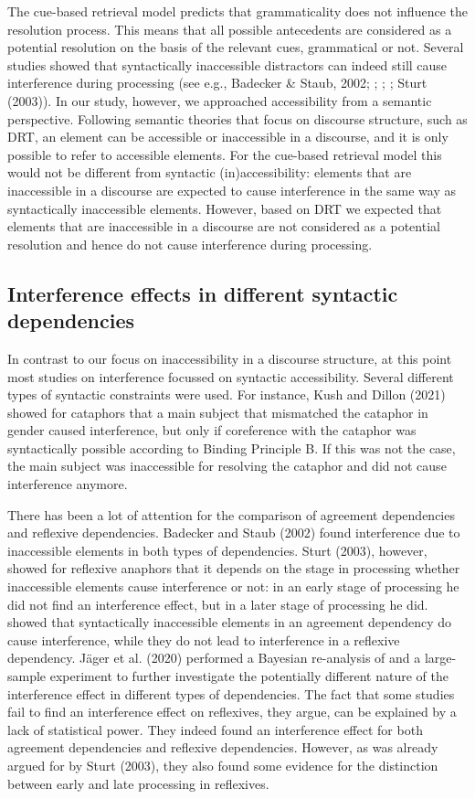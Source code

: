 \documentclass[11pt]{article} %
\begin{document}
The cue-based retrieval model predicts that grammaticality does not influence the resolution process. This means that all possible antecedents are considered as a potential resolution on the basis of the relevant cues, grammatical or not. Several studies showed that syntactically inaccessible distractors can indeed still cause interference during processing (see e.g., Badecker \& Staub, 2002; \cite{dillon+13}; \cite{jager+17}; \cite{kush+15}; Sturt (2003)). In our study, however, we approached accessibility from a semantic perspective. Following semantic theories that focus on discourse structure, such as DRT, an element can be accessible or inaccessible in a discourse, and it is only possible to refer to accessible elements. For the cue-based retrieval model this would not be different from syntactic (in)accessibility: elements that are inaccessible in a discourse are expected to cause interference in the same way as syntactically inaccessible elements. However, based on DRT we expected that elements that are inaccessible in a discourse are not considered as a potential resolution and hence do not cause interference during processing.

\subsection{Interference effects in different syntactic dependencies}
In contrast to our focus on inaccessibility in a discourse structure, at this point most studies on interference focussed on syntactic accessibility. Several different types of syntactic constraints were used. For instance, Kush and Dillon (2021) showed for cataphors that a main subject that mismatched the cataphor in gender caused interference, but only if coreference with the cataphor was syntactically possible according to Binding Principle B. If this was not the case, the main subject was inaccessible for resolving the cataphor and did not cause interference anymore. 

There has been a lot of attention for the comparison of agreement dependencies and reflexive dependencies. Badecker and Staub (2002) found interference due to inaccessible elements in both types of dependencies. Sturt (2003), however, showed for reflexive anaphors that it depends on the stage in processing whether inaccessible elements cause interference or not: in an early stage of processing he did not find an interference effect, but in a later stage of processing he did. \cite{dillon+13} showed that syntactically inaccessible elements in an agreement dependency do cause interference, while they do not lead to interference in a reflexive dependency. J{\"a}ger et al. (2020) performed a Bayesian re-analysis of \cite{dillon+13} and a large-sample experiment to further investigate the potentially different nature of the interference effect in different types of dependencies. The fact that some studies fail to find an interference effect on reflexives, they argue, can be explained by a lack of statistical power. They indeed found an interference effect for both agreement dependencies and reflexive dependencies. However, as was already argued for by Sturt (2003), they also found some evidence for the distinction between early and late processing in reflexives. 
\end{document}
